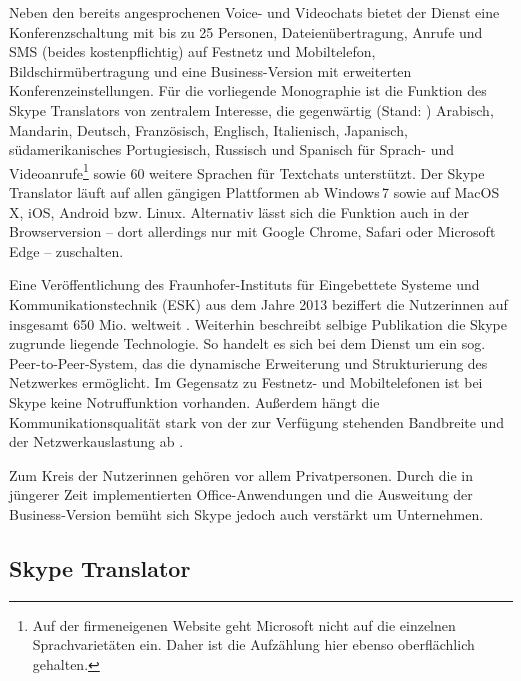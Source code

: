 Neben den bereits angesprochenen Voice- und Videochats bietet der Dienst eine Konferenzschaltung mit bis zu 25 Personen, Dateienübertragung, Anrufe und SMS (beides kostenpflichtig) auf Festnetz und Mobiltelefon, Bildschirmübertragung und eine Business-Version mit erweiterten Konferenzeinstellungen. Für die vorliegende Monographie ist die Funktion des Skype Translators von zentralem Interesse, die gegenwärtig (Stand: \datum{}) Arabisch, Mandarin, Deutsch, Französisch, Englisch, Italienisch, Japanisch, südamerikanisches Portugiesisch, Russisch und Spanisch für Sprach- und Videoanrufe\footnote{Auf der firmeneigenen Website geht Microsoft nicht auf die einzelnen Sprachvarietäten ein. Daher ist die Aufzählung hier ebenso oberflächlich gehalten.} sowie 60 weitere Sprachen für Textchats unterstützt. Der Skype Translator läuft auf allen gängigen Plattformen ab Windows\,7 sowie auf MacOS X, iOS, Android bzw. Linux. Alternativ lässt sich die Funktion auch in der Browserversion -- dort allerdings nur mit Google Chrome, Safari oder Microsoft Edge -- zuschalten.

Eine Veröffentlichung des Fraunhofer-Instituts für Eingebettete Systeme und Kommunikationstechnik (ESK) aus dem Jahre 2013 beziffert die Nutzer{\textperiodcentered}innen auf insgesamt 650 Mio. weltweit \citep[6]{messerer_einsatz_2013}. Weiterhin beschreibt selbige Publikation die Skype zugrunde liegende Technologie. So handelt es sich bei dem Dienst um ein sog. Peer-to-Peer-System, das die dynamische Erweiterung und Strukturierung des Netzwerkes ermöglicht. Im Gegensatz zu Festnetz- und Mobiltelefonen ist bei Skype keine Notruffunktion vorhanden. Außerdem hängt die Kommunikationsqualität stark von der zur Verfügung stehenden Bandbreite und der Netzwerkauslastung ab \citep[4]{messerer_einsatz_2013}.

Zum Kreis der Nutzer{\textperiodcentered}innen gehören vor allem Privatpersonen. Durch die in jüngerer Zeit implementierten Office-Anwendungen und die Ausweitung der Business-Version bemüht sich Skype jedoch auch verstärkt um Unternehmen.



\subsection{Skype Translator}\largerpage
\label{K3:subsec:SkypeTranslator}


